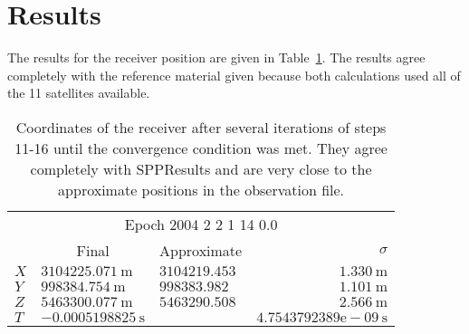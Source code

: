 \section{Results} %
\label{sec:results}

The results for the receiver position are given in Table~\ref{tab:receiverCoordinates}.  The results agree completely with the reference material given because both calculations used all of the 11 satellites available.
\begin{table}[htbp]
	\begin{center}
		\begin{tabular}{lllr}
		\toprule
		\multicolumn{4}{c}{Epoch 2004 2 2 1 14 0.0} \\ 
		& \multicolumn{1}{c}{Final} & \multicolumn{1}{c}{Approximate} & \multicolumn{1}{r}{$\sigma$} \\
		\cmidrule(r){2-4} 
			$X$ & $ 3104225.071~\text{m}$		&$3104219.453$ & $1.330~\text{m}$		\\
			$Y$ & $ 998384.754~\text{m}$		&$998383.982$  & $1.101~\text{m}$	\\
			$Z$ & $ 5463300.077~\text{m}$		&$5463290.508$ & $2.566~\text{m}$		\\
			$T$ & $ -0.0005198825~\text{s}$ 	& 			   & $4.7543792389\text{e}-09~\text{s}$		\\
		\bottomrule
		\end{tabular}
	\end{center}
	\caption{Coordinates of the receiver after several iterations of steps 11-16 until the convergence condition was met.  They agree completely with SPPResults and are very close to the approximate positions in the observation file.}
	\label{tab:receiverCoordinates}
\end{table}


